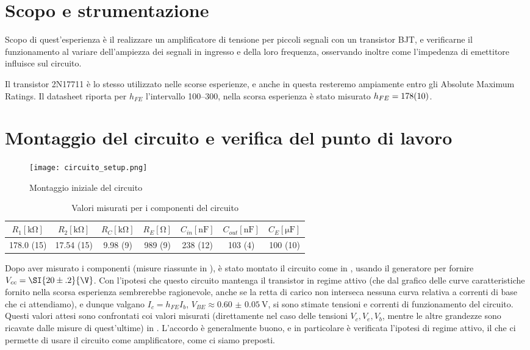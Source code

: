 \section{Scopo e strumentazione}

Scopo di quest'esperienza è il realizzare un amplificatore di tensione per piccoli segnali con un transistor BJT,
e verificarne il funzionamento al variare dell'ampiezza dei segnali in ingresso e della loro frequenza,
osservando inoltre come l'impedenza di emettitore influisce sul circuito.

Il transistor 2N17711 è lo stesso utilizzato nelle scorse esperienze, e anche in questa resteremo ampiamente entro gli Absolute Maximum Ratings.
Il datasheet riporta per $h_{FE}$ l'intervallo 100--300, nella scorsa esperienza è stato misurato $h_{FE} = \SI{178 (10)}{}$.

\section{Montaggio del circuito e verifica del punto di lavoro}

\begin{figure}[h]
	\centering
	\texttt{[image: circuito\_setup.png]}
	\caption{Montaggio iniziale del circuito}
	\label{f:setup}
\end{figure}

\begin{table}[h]
	\centering
	\begin{tabular}{*{3}{S[table-figures-decimal = 2, table-figures-uncertainty = 2]} *{4}{S[table-figures-decimal = 0, table-figures-uncertainty = 2]}} 
		{$R_1 [\si{\kohm}]$} & {$R_2 [\si{\kohm}]$} & {$R_C [\si{\kohm}]$} & {$R_E [\si{\ohm}]$} & {$C_{in} [\si{\nano\farad}]$} & {$C_{out} [\si{\nano\farad}]$} & {$C_E [\si{\micro\farad}]$} \\
		 (15)	&	17.54 (15)	&	9.98 (9)	&	989 (9)	&	238 (12)	&	103 (4)	&	100 (10)	\\ 
	\end{tabular} 
	\caption{Valori misurati per i componenti del circuito}
	\label{t:misure_setup}
\end{table}

Dopo aver misurato i componenti (misure riassunte in ), è stato montato il circuito come in , usando il generatore per fornire $V_{cc}  =\SI{20 \pm .2}{\V}$.
Con l'ipotesi che questo circuito mantenga il transistor in regime attivo (che dal grafico delle curve caratteristiche fornito nella scorsa esperienza sembrerebbe ragionevole,
anche se la retta di carico non interseca nessuna curva relativa a correnti di base che ci attendiamo),
e dunque valgano $I_c = h_{FE} I_b$, $V_{BE} \approx \SI{0.60(5)}{\V}$, si sono stimate tensioni e correnti di funzionamento del circuito.
Questi valori attesi sono confrontati coi valori misurati (direttamente nel caso delle tensioni $V_c, V_e, V_b$, mentre le altre grandezze sono ricavate dalle misure di quest'ultime) in .
L'accordo è generalmente buono, e in particolare è verificata l'ipotesi di regime attivo, il che ci permette di usare il circuito come amplificatore, come ci siamo preposti.

